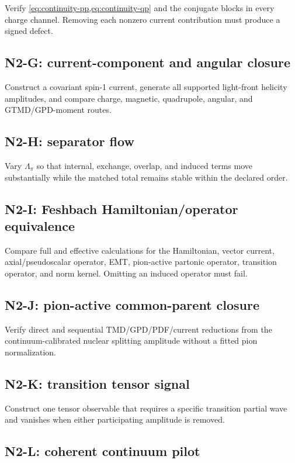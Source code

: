 \documentclass[11pt]{article}
\begin{document}
Verify \cref{eq:continuity-pp,eq:continuity-qp} and the conjugate blocks in
every charge channel.  Removing each nonzero current contribution must produce
a signed defect.

\subsection{N2-G: current-component and angular closure}

Construct a covariant spin-1 current, generate all supported light-front
helicity amplitudes, and compare charge, magnetic, quadrupole, angular, and
GTMD/GPD-moment routes.

\subsection{N2-H: separator flow}

Vary \(\Lambda_\pi\) so that internal, exchange, overlap, and induced terms
move substantially while the matched total remains stable within the declared
order.

\subsection{N2-I: Feshbach Hamiltonian/operator equivalence}

Compare full and effective calculations for the Hamiltonian, vector current,
axial/pseudoscalar operator, EMT, pion-active partonic operator, transition
operator, and norm kernel.  Omitting an induced operator must fail.

\subsection{N2-J: pion-active common-parent closure}

Verify direct and sequential TMD/GPD/PDF/current reductions from the
continuum-calibrated nuclear splitting amplitude without a fitted pion
normalization.

\subsection{N2-K: transition tensor signal}

Construct one tensor observable that requires a specific transition partial
wave and vanishes when either participating amplitude is removed.

\subsection{N2-L: coherent continuum pilot}
\end{document}
